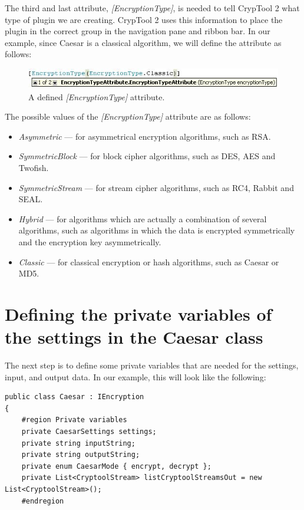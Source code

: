 The third and last attribute, \textit{[EncryptionType]}, is needed to tell CrypTool 2 what type of plugin we are creating. CrypTool 2 uses this information to place the plugin in the correct group in the navigation pane and ribbon bar. In our example, since Caesar is a classical algorithm, we will define the attribute as follows:

\begin{figure}[h]
	\centering
		\includegraphics[width=.90\textwidth]{figures/attribute_encryptiontype.jpg}
	\caption{A defined \textit{[EncryptionType]} attribute.}
	\label{fig:attribute_encryption_type}
\end{figure}

The possible values of the \textit{[EncryptionType]} attribute are as follows:

\begin{itemize}
	\item \textit{Asymmetric} --- for asymmetrical encryption algorithms, such as RSA.
	\item \textit{SymmetricBlock} --- for block cipher algorithms, such as DES, AES and Twofish.
	\item \textit{SymmetricStream} --- for stream cipher algorithms, such as RC4, Rabbit and SEAL.
	\item \textit{Hybrid} --- for algorithms which are actually a combination of several algorithms, such as algorithms in which the data is encrypted symmetrically and the encryption key asymmetrically.
	\item \textit{Classic} --- for classical encryption or hash algorithms, such as Caesar or MD5.
\end{itemize}

\section{Defining the private variables of the settings in the Caesar class}
\label{sec:DefiningThePrivateVariablesOfTheSettingsInTheCaesarClass}

The next step is to define some private variables that are needed for the settings, input, and output data. In our example, this will look like the following:

\begin{lstlisting}
public class Caesar : IEncryption
{
	#region Private variables
	private CaesarSettings settings;
	private string inputString;
	private string outputString;
	private enum CaesarMode { encrypt, decrypt };
	private List<CryptoolStream> listCryptoolStreamsOut = new List<CryptoolStream>();
	#endregion
\end{lstlisting}

